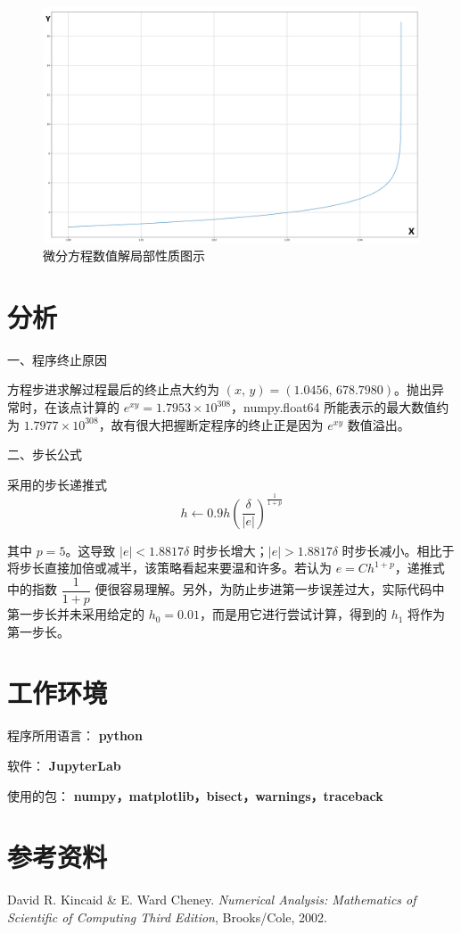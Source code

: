 \documentclass{ctexart}
\begin{document}
\begin{figure}[H]
	\centering
	\includegraphics[width = 15cm, height = 7cm]{Figure.png}
	\caption{微分方程数值解局部性质图示} \label{figure.label}
\end{figure}
	
\section*{分析}
	\noindent 一、程序终止原因
	
	方程步进求解过程最后的终止点大约为 $(x,\,y) = (1.0456,\,678.7980)$。抛出异常时，在该点计算的 $e^{xy} = 1.7953 \times 10^{308}$，numpy.float64 所能表示的最大数值约为 $1.7977 \times 10^{308}$，故有很大把握断定程序的终止正是因为 $e^{xy}$ 数值溢出。
	
	\noindent 二、步长公式
	
	采用的步长递推式
	\begin{equation}
		h \leftarrow 0.9 h\left(\dfrac{\delta}{|e|}\right)^{\frac{1}{1+p}}
	\end{equation}
	
	其中 $p = 5$。这导致 $|e| < 1.8817\delta$ 时步长增大；$|e| > 1.8817\delta$ 时步长减小。相比于将步长直接加倍或减半，该策略看起来要温和许多。若认为 $e = Ch^{1+p}$，递推式中的指数 $\dfrac{1}{1 + p}$ 便很容易理解。另外，为防止步进第一步误差过大，实际代码中第一步长并未采用给定的 $h_0 = 0.01$，而是用它进行尝试计算，得到的 $h_1$ 将作为第一步长。
	


\section*{工作环境}
	程序所用语言： {\bf python}
	
	软件： {\bf JupyterLab}
	
	使用的包： {\bf numpy，matplotlib，bisect，warnings，traceback}

	
\section*{参考资料}
	\noindent [1] David R. Kincaid \& E. Ward Cheney. {\it Numerical Analysis: Mathematics of Scientific of Computing Third Edition}, Brooks/Cole, 2002.
\end{document}
